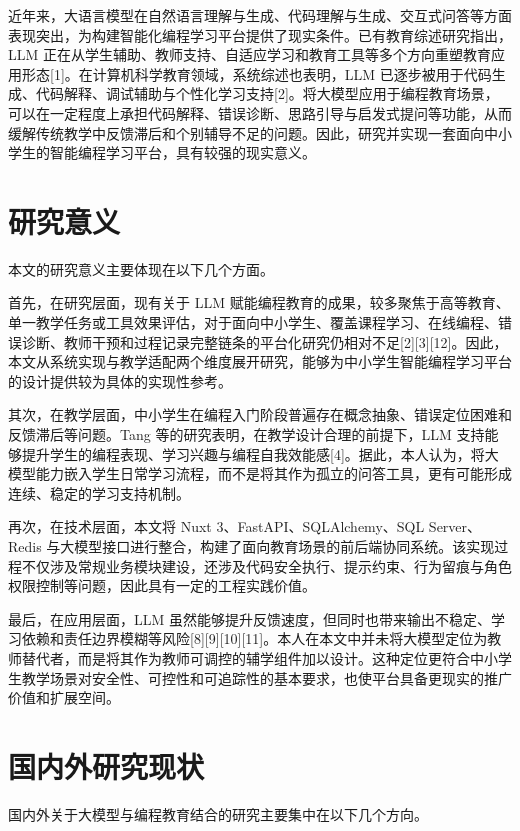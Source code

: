 近年来，大语言模型在自然语言理解与生成、代码理解与生成、交互式问答等方面表现突出，为构建智能化编程学习平台提供了现实条件。已有教育综述研究指出，LLM 正在从学生辅助、教师支持、自适应学习和教育工具等多个方向重塑教育应用形态{[}1{]}。在计算机科学教育领域，系统综述也表明，LLM 已逐步被用于代码生成、代码解释、调试辅助与个性化学习支持{[}2{]}。将大模型应用于编程教育场景，可以在一定程度上承担代码解释、错误诊断、思路引导与启发式提问等功能，从而缓解传统教学中反馈滞后和个别辅导不足的问题。因此，研究并实现一套面向中小学生的智能编程学习平台，具有较强的现实意义。

\section{研究意义}\label{ux7814ux7a76ux610fux4e49}

本文的研究意义主要体现在以下几个方面。

首先，在研究层面，现有关于 LLM 赋能编程教育的成果，较多聚焦于高等教育、单一教学任务或工具效果评估，对于面向中小学生、覆盖课程学习、在线编程、错误诊断、教师干预和过程记录完整链条的平台化研究仍相对不足{[}2{]}{[}3{]}{[}12{]}。因此，本文从系统实现与教学适配两个维度展开研究，能够为中小学生智能编程学习平台的设计提供较为具体的实现性参考。

其次，在教学层面，中小学生在编程入门阶段普遍存在概念抽象、错误定位困难和反馈滞后等问题。Tang 等的研究表明，在教学设计合理的前提下，LLM 支持能够提升学生的编程表现、学习兴趣与编程自我效能感{[}4{]}。据此，本人认为，将大模型能力嵌入学生日常学习流程，而不是将其作为孤立的问答工具，更有可能形成连续、稳定的学习支持机制。

再次，在技术层面，本文将 Nuxt 3、FastAPI、SQLAlchemy、SQL Server、Redis 与大模型接口进行整合，构建了面向教育场景的前后端协同系统。该实现过程不仅涉及常规业务模块建设，还涉及代码安全执行、提示约束、行为留痕与角色权限控制等问题，因此具有一定的工程实践价值。

最后，在应用层面，LLM 虽然能够提升反馈速度，但同时也带来输出不稳定、学习依赖和责任边界模糊等风险{[}8{]}{[}9{]}{[}10{]}{[}11{]}。本人在本文中并未将大模型定位为教师替代者，而是将其作为教师可调控的辅学组件加以设计。这种定位更符合中小学生教学场景对安全性、可控性和可追踪性的基本要求，也使平台具备更现实的推广价值和扩展空间。

\section{国内外研究现状}\label{ux56fdux5185ux5916ux7814ux7a76ux73b0ux72b6}

国内外关于大模型与编程教育结合的研究主要集中在以下几个方向。

